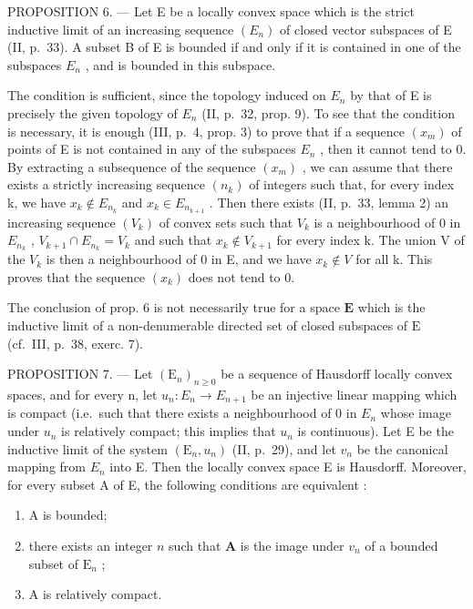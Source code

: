 PROPOSITION 6. --- Let E be a locally convex space which is the strict inductive limit of an increasing sequence \((E_{n})\) of closed vector subspaces of E (II, p.~33). A subset B of E is bounded if and only if it is contained in one of the subspaces \(E_{n}\) , and is bounded in this subspace.

The condition is sufficient, since the topology induced on \(E_{n}\) by that of E is precisely the given topology of \(E_{n}\) (II, p.~32, prop. 9). To see that the condition is necessary, it is enough (III, p.~4, prop. 3) to prove that if a sequence \((x_{m})\) of points of E is not contained in any of the subspaces \(E_{n}\) , then it cannot tend to 0. By extracting a subsequence of the sequence \((x_{m})\) , we can assume that there exists a strictly increasing sequence \((n_{k})\) of integers such that, for every index k, we have \(x_{k} \notin E_{n_{k}}\) and \(x_{k} \in E_{n_{k+1}}\) . Then there exists (II, p.~33, lemma 2) an increasing sequence \((V_{k})\) of convex sets such that \(V_{k}\) is a neighbourhood of 0 in \(E_{n_{k}}\) , \(V_{k+1} \cap E_{n_{k}} = V_{k}\) and such that \(x_{k} \notin V_{k+1}\) for every index k. The union V of the \(V_{k}\) is then a neighbourhood of 0 in E, and we have \(x_{k} \notin V\) for all k. This proves that the sequence \((x_{k})\) does not tend to 0.

The conclusion of prop. 6 is not necessarily true for a space \(\mathbf{E}\) which is the inductive limit of a non-denumerable directed set of closed subspaces of \(\mathrm{E}\) (cf.~III, p.~38, exerc. 7).

PROPOSITION 7. --- Let \((\mathrm{E}_{n})_{n\geq0}\) be a sequence of Hausdorff locally convex spaces, and for every n, let \(u_{n}:E_{n}\to E_{n+1}\) be an injective linear mapping which is compact (i.e.~such that there exists a neighbourhood of 0 in \(E_{n}\) whose image under \(u_{n}\) is relatively compact; this implies that \(u_{n}\) is continuous). Let E be the inductive limit of the system \((\mathrm{E}_{n},u_{n})\) (II, p.~29), and let \(v_{n}\) be the canonical mapping from \(E_{n}\) into E. Then the locally convex space E is Hausdorff. Moreover, for every subset A of E, the following conditions are equivalent :

\begin{enumerate}
\def\labelenumi{(\roman{enumi})}
\item
  A is bounded;
\item
  there exists an integer \(n\) such that \(\mathbf{A}\) is the image under \(v_{n}\) of a bounded subset of \(\mathrm{E}_n\) ;
\item
  A is relatively compact.
\end{enumerate}


